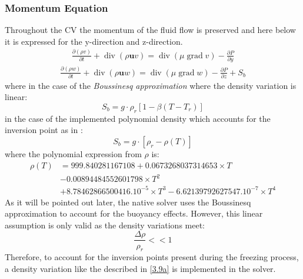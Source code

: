 \subsubsection{Momentum Equation}
Throughout the CV the momentum of the fluid flow is preserved and here below it is expressed for the y-direction and z-direction.
\begin{equation}
	\begin{aligned}
		\frac{\partial(\rho v)}{\partial t}+\operatorname{div}(\rho \mathbf{u} v)=\operatorname{div}(\mu \operatorname{grad} v)-\frac{\partial P}{\partial y}
	\end{aligned}
	\label{3.6}
\end{equation}
\begin{equation}
	\begin{aligned}
		\frac{\partial(\rho w)}{\partial t}+\operatorname{div}(\rho \mathbf{u} w)=\operatorname{div}(\mu \operatorname{grad} w)-\frac{\partial P}{\partial z}+S_{b}
	\end{aligned}
	\label{3.7}
\end{equation}
where in the case of the \textit{Boussinesq approximation} where the density variation is linear:
\begin{equation}
	S_{b} = g\cdot\rho_{r}[1-\beta(T-T_{r})]
	\label{3.8}
\end{equation}
in the case of the implemented polynomial density which accounts for the inversion point as in \cite{bourdillon_2016}:
\begin{equation}
S_{b} = g\cdot[\rho_{r}-\rho(T)]
\label{3.9}
\end{equation}
where the polynomial expression from $\rho$ is:
\begin{equation}
	\begin{aligned}
		\rho(T) &=999.840281167108+0.0673268037314653 \times T \\
		&-0.00894484552601798 \times T^{2} \\
		&+8.78462866500416 .10^{-5} \times T^{3} 
		-6.62139792627547 .10^{-7} \times T^{4}
	\end{aligned}
	\label{3.9a}
\end{equation}
As it will be pointed out later, the native solver uses the Boussinesq approximation to account for the buoyancy effects. However, this linear assumption is only valid as the density variations meet:
\begin{equation}
\frac{\Delta \rho}{\rho_{r}}<<1
\label{3.10}
\end{equation}
Therefore, to account for the inversion points present during the freezing process, a density variation like the described in \ref{3.9a} is implemented in the solver.

